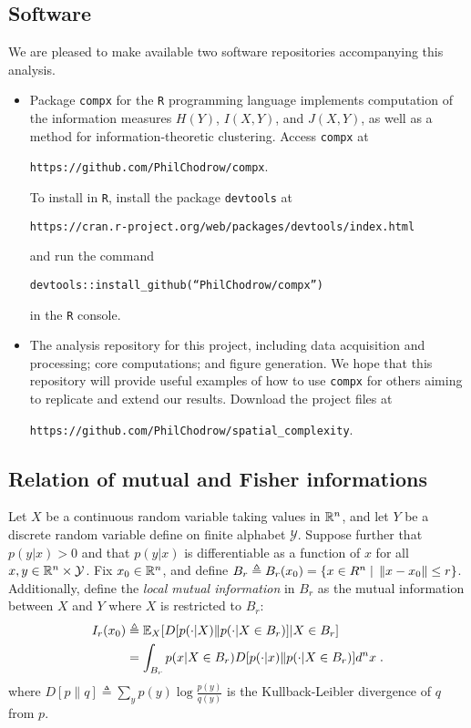 
\subsection*{Software} 

  We are pleased to make available two software repositories accompanying this analysis. 
  \begin{itemize}
    \item Package 
    \texttt{compx} for the \texttt{R} programming language implements computation of the information measures $H(Y)$, $I(X,Y)$, and $J(X,Y)$, as well as a method for information-theoretic clustering. Access \texttt{compx} at 
    \begin{displayquote}
      \texttt{https://github.com/PhilChodrow/compx}. 
    \end{displayquote}
    To install in \texttt{R}, install the package \texttt{devtools} at 
    \begin{displayquote}
    \texttt{https://cran.r-project.org/web/packages/devtools/index.html}
    \end{displayquote}
     and run the command 
    \begin{displayquote}
      \texttt{devtools::install\_github(``PhilChodrow/compx'')}
    \end{displayquote}
    in the \texttt{R} console. 
    \item The analysis repository for this project, including data acquisition and processing; core computations; and figure generation. We hope that this repository will provide useful examples of how to use \texttt{compx} for others aiming to replicate and extend our results. Download the project files at 
    \begin{displayquote}
      \texttt{https://github.com/PhilChodrow/spatial\_complexity}. 
    \end{displayquote}
  \end{itemize}

\subsection*{Relation of mutual and Fisher informations}
	Let $X$ be a continuous random variable taking values in $\mathbb{R}^n$, and let $Y$ be a discrete random variable define on finite alphabet $\mathcal{Y}$. Suppose further that $p(y|x) > 0$ and that $p(y|x)$ is differentiable as a function of $x$ for all $x,y \in \mathbb{R}^n \times \mathcal{Y}$. Fix $x_0 \in \mathbb{R}^n$, and define $B_r \triangleq B_r(x_0) = \{ x \in R^n \;|\; \left\lVert x - x_0\right\rVert \leq r \}$. Additionally, define the \emph{local mutual information} in $B_r$ as the mutual information between $X$ and $Y$ where $X$ is restricted to $B_r$:
	\begin{align}
		I_r(x_0) &\triangleq \mathbb{E}_X[D[p(\cdot|X)\| p(\cdot|X \in B_r)]|X \in B_r] \\
		&= \int_{B_r} p(x|X \in B_r) D[p(\cdot|x)\| p(\cdot|X \in B_r)] d^n x\;.
	\end{align}
	where $D[p\|q] \triangleq \sum_{y} p(y) \log \frac{p(y)}{q(y)}$ is the Kullback-Leibler divergence of $q$ from $p$. 

